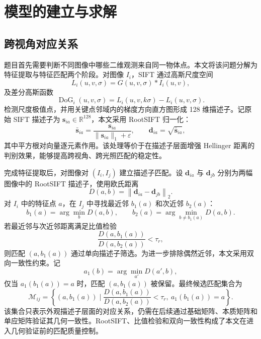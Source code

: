 \documentclass[lang=cn,a4paper,newtx]{elegantpaper} %
\begin{document}
\section{模型的建立与求解}
\subsection{跨视角对应关系}
题目首先需要判断不同图像中哪些二维观测来自同一物体点。本文将该问题分解为特征提取与特征匹配两个阶段。对图像 $I_i$，SIFT 通过高斯尺度空间
\begin{equation}
    L_i(u,v,\sigma)=G(u,v,\sigma)*I_i(u,v),
\end{equation}
及差分高斯函数
\begin{equation}
    \operatorname{DoG}_i(u,v,\sigma)
    =L_i(u,v,k\sigma)-L_i(u,v,\sigma).
\end{equation}
检测尺度极值点，并用关键点邻域内的梯度方向直方图形成 128 维描述子。记原始 SIFT 描述子为 $\mathbf{s}_{ia}\in\mathbb{R}^{128}$，本文采用 RootSIFT 归一化：
\begin{equation}
    \bar{\mathbf{s}}_{ia}
    =
    \frac{\mathbf{s}_{ia}}
    {\|\mathbf{s}_{ia}\|_1+\varepsilon},
    \qquad
    \mathbf{d}_{ia}
    =
    \sqrt{\bar{\mathbf{s}}_{ia}},
\end{equation}
其中平方根对向量逐元素作用。该处理等价于在描述子层面增强 Hellinger 距离的判别效果，能够提高跨视角、跨光照匹配的稳定性。

完成特征提取后，对图像对 $(I_i,I_j)$ 建立描述子匹配。设 $\mathbf{d}_{ia}$ 与 $\mathbf{d}_{jb}$ 分别为两幅图像中的 RootSIFT 描述子，使用欧氏距离
\begin{equation}
    D(a,b)=\left\|\mathbf{d}_{ia}-\mathbf{d}_{jb}\right\|_2 .
\end{equation}
对 $I_i$ 中的特征点 $a$，在 $I_j$ 中寻找最近邻 $b_1(a)$ 和次近邻 $b_2(a)$：
\begin{equation}
    b_1(a)=\arg\min_b D(a,b),
    \qquad
    b_2(a)=\arg\min_{b\ne b_1(a)} D(a,b).
\end{equation}
若最近邻与次近邻距离满足比值检验
\begin{equation}
    \frac{D(a,b_1(a))}{D(a,b_2(a))}<\tau_r ,
\end{equation}
则匹配 $(a,b_1(a))$ 通过单向描述子筛选。为进一步排除偶然近邻，本文采用双向一致性约束。记
\begin{equation}
    a_1(b)=\arg\min_{a'} D(a',b),
\end{equation}
仅当 $a_1(b_1(a))=a$ 时，匹配 $(a,b_1(a))$ 被保留。最终候选匹配集合为
\begin{equation}
    \mathcal{M}_{ij}
    =
    \left\{
    (a,b_1(a))\mid
    \frac{D(a,b_1(a))}{D(a,b_2(a))}<\tau_r,\ 
    a_1(b_1(a))=a
    \right\}.
\end{equation}
该集合只表示外观描述子层面的对应关系，仍需在后续通过基础矩阵、本质矩阵和单应矩阵验证其几何一致性。RootSIFT、比值检验和双向一致性构成了本文在进入几何验证前的匹配质量控制。
\end{document}
